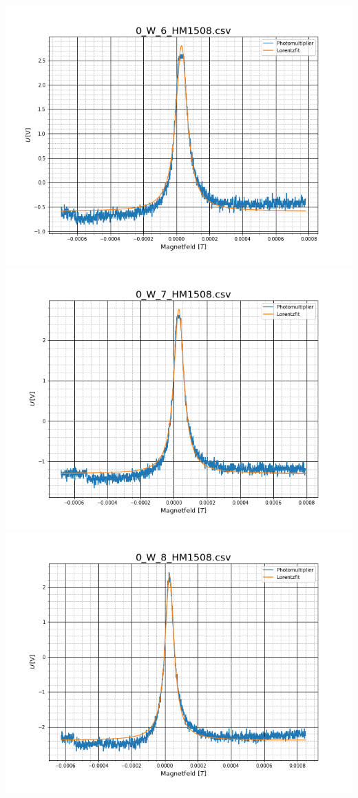 \includegraphics[scale=0.3]{Bild/Anhang/Erwarmung/erw7}
\includegraphics[scale=0.3]{Bild/Anhang/Erwarmung/erw8}\\
\includegraphics[scale=0.3]{Bild/Anhang/Erwarmung/erw9}
